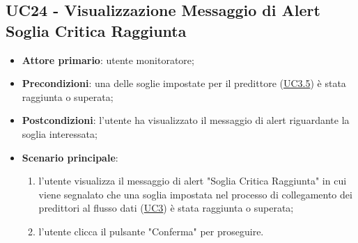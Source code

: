 
\label{par:UC24}
	\subsection{UC24 - Visualizzazione Messaggio di Alert Soglia Critica Raggiunta}
		\begin{itemize}
			\item\textbf{Attore primario}: utente monitoratore;
			\item\textbf{Precondizioni}: una delle soglie impostate per il predittore (\hyperref[par:UC3.5]{UC3.5}) è stata raggiunta o superata;
			\item\textbf{Postcondizioni}: l’utente ha visualizzato il messaggio di alert riguardante la soglia interessata;
			\item\textbf{Scenario principale}:
				\begin{enumerate}
					\item l’utente visualizza il messaggio di alert "Soglia Critica Raggiunta" in cui viene segnalato che una soglia impostata nel processo di collegamento dei predittori al flusso dati (\hyperref[par:UC3]{UC3}) è stata raggiunta o superata;
					\item l'utente clicca il pulsante "Conferma" per proseguire.		
				\end{enumerate}		
		\end{itemize}
	






